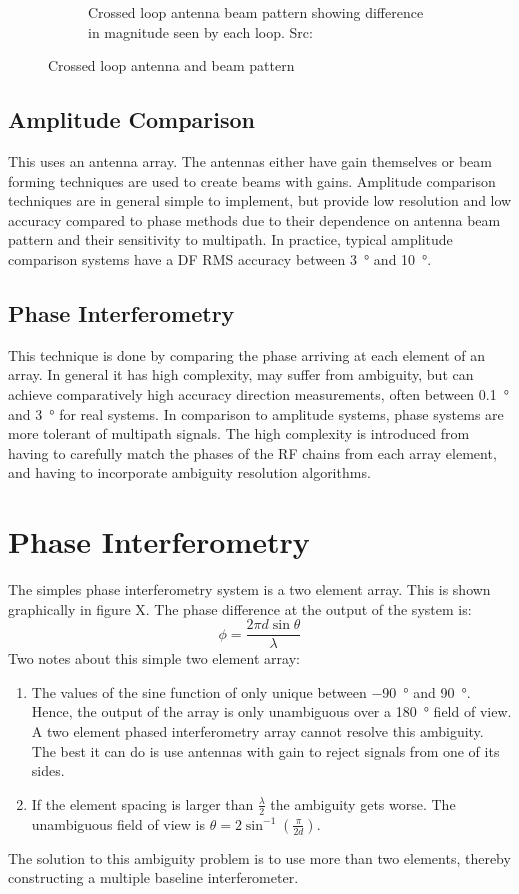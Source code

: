 \begin{figure}
\begin{subfigure}[b]{0.4\textwidth}
    \caption{Crossed loop antenna beam pattern showing difference in magnitude seen by each loop. Src: \cite{jenkins1991smallaperture}}
  \end{subfigure}
  \caption{Crossed loop antenna and beam pattern}
  \label{fig:lit_crossed_loop_antenna}
\end{figure}

\subsection{Amplitude Comparison}
This uses an antenna array. The antennas either have gain themselves or beam forming techniques are used to create beams with gains. Amplitude comparison techniques are in general simple to implement, but provide low resolution and low accuracy compared to phase methods due to their dependence on antenna beam pattern and their sensitivity to multipath. In practice, typical amplitude comparison systems have a DF RMS accuracy between \SI{3}{\degree} and \SI{10}{\degree}.
\subsection{Phase Interferometry}
This technique is done by comparing the phase arriving at each element of an array. In general it has high complexity, may suffer from ambiguity, but can achieve comparatively high accuracy direction measurements, often between \SI{0.1}{\degree} and \SI{3}{\degree} for real systems. In comparison to amplitude systems, phase systems are more tolerant of multipath signals. The high complexity is introduced from having to carefully match the phases of the RF chains from each array element, and having to incorporate ambiguity resolution algorithms. 

\section{Phase Interferometry}
The simples phase interferometry system is a two element array. This is shown graphically in figure X. The phase difference at the output of the system is:
\begin{equation}
\phi = \frac{2 \pi d \sin \theta}{\lambda}
\end{equation}
Two notes about this simple two element array:
\begin{enumerate}
  \item The values of the sine function of only unique between \SI{-90}{\degree} and \SI{90}{\degree}. Hence, the output of the array is only unambiguous over a \SI{180}{\degree} field of view. A two element phased interferometry array cannot resolve this ambiguity. The best it can do is use antennas with gain to reject signals from one of its sides. 
 \item If the element spacing is larger than \(\frac{\lambda}{2}\) the ambiguity gets worse. The unambiguous field of view is \(\theta = 2 \sin^{-1}(\frac{\pi}{2d})\).
 \end{enumerate}
 The solution to this ambiguity problem is to use more than two elements, thereby constructing a multiple baseline interferometer. 
